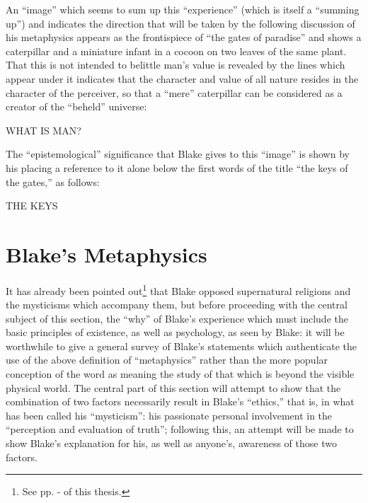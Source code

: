 An \enquote{image} which seems to sum up this \enquote{experience} (which is itself a \enquote{summing up}) and indicates the
direction that will be taken by the following discussion of his metaphysics appears as the frontispiece of
\enquote{the gates of paradise}\supercite{keynes:william-blake}
and shows a caterpillar and a miniature infant in a cocoon on two leaves
of the same plant. That this is not intended to belittle man's value is revealed by the lines which
appear under it indicates that the character and value of all nature resides in the character of the perceiver,
so that a \enquote{mere} caterpillar can be considered as a creator of the \enquote{beheld} universe:

{
	\centering
	WHAT IS MAN?\par
}


The \enquote{epistemological} significance that Blake gives to this \enquote{image} is shown by his placing
a reference to it alone below the first words of the title \enquote{the keys of the gates,} as follows:

{
	\centering
	THE KEYS\par
}


\section{Blake's Metaphysics}

It has already been pointed out\footnote{See pp. \pageref{self:20}-\pageref{self:21} of this thesis.}
that Blake opposed supernatural religions and the mysticisms which accompany them,
but before proceeding with the central subject of this section, the \enquote{why} of Blake's experience which must include the
basic principles of existence, as well as psychology, as seen by Blake: it will be worthwhile to give
a general survey of Blake's statements which authenticate the use of the above definition of \enquote{metaphysics} rather
than the more popular conception of the word as meaning the study of that which is beyond the visible physical world.
The central part of this section will attempt to show that the combination of
%
\label{self:24}%
two factors necessarily result in
Blake's \enquote{ethics,} that is, in what has been called his \enquote{mysticism}: his passionate personal
involvement in the \enquote{perception and evaluation of truth}; following this, an attempt will be made to
show Blake's explanation for his, as well as anyone's, awareness of those two factors.

